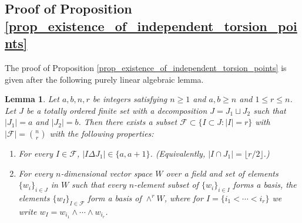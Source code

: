 \documentclass{article} %
\newtheorem{lemma}[proposition]{Lemma}
\numberwithin{equation}{section}
\begin{document}
\subsection{Proof of Proposition \ref{prop_existence_of_independent_torsion_points}}\label{subsec_generic_spin_basis}
The proof of Proposition \ref{prop_existence_of_independent_torsion_points} is given after the following purely linear algebraic lemma.
\begin{lemma}\label{lem_exterior_power_uniform_matroid}
    Let $a,b,n,r$ be integers satisfying $n\geq 1$ and $a,b\geq n$ and $1\leq r \leq n$.
    Let $J$ be a totally ordered finite set with a decomposition $J  = J_1\sqcup J_2$ such that $|J_1| = a$ and $|J_2| = b$.
    Then there exists a subset $\mathcal{F}\subset \{I\subset J \colon |I| = r\}$ with $|\mathcal{F}| = \binom{n}{r}$ with the following properties:
    \begin{enumerate}
        \item For every $I\in \mathcal{F}$, $|I\Delta J_1| \in \{a,a+1\}$. (Equivalently, $|I \cap J_1| = \lfloor r/2 \rfloor$.)
        \item For every $n$-dimensional vector space $W$ over a field and set of elements $\{w_i\}_{i\in J}$ in $W$ such that every $n$-element subset of $\{w_i\}_{i \in I}$ forms a basis, the elements $\{w_I\}_{I\in \mathcal{F}}$ form a basis of $\wedge^r W$, where for $I = \{i_1< \cdots < i_r\}$ we write $w_I = w_{i_1} \wedge \cdots \wedge w_{i_r}$.
    \end{enumerate}
\end{lemma}
\end{document}

